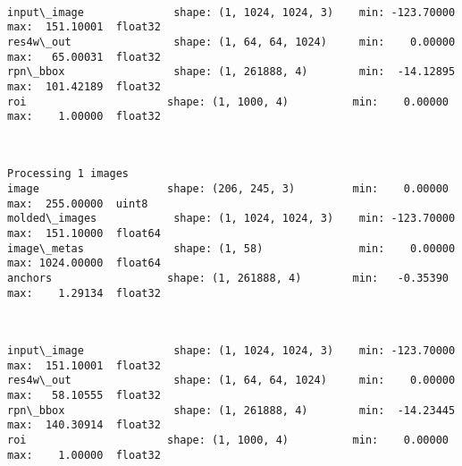 \documentclass[11pt]{article}
\begin{document}
    \begin{center}
    \end{center}
    { \hspace*{\fill} \\}
    
    \begin{Verbatim}[commandchars=\\\{\}]
input\_image              shape: (1, 1024, 1024, 3)    min: -123.70000  max:  151.10001  float32
res4w\_out                shape: (1, 64, 64, 1024)     min:    0.00000  max:   65.00031  float32
rpn\_bbox                 shape: (1, 261888, 4)        min:  -14.12895  max:  101.42189  float32
roi                      shape: (1, 1000, 4)          min:    0.00000  max:    1.00000  float32

    \end{Verbatim}

    \begin{center}
    \end{center}
    { \hspace*{\fill} \\}
    
    \begin{Verbatim}[commandchars=\\\{\}]
Processing 1 images
image                    shape: (206, 245, 3)         min:    0.00000  max:  255.00000  uint8
molded\_images            shape: (1, 1024, 1024, 3)    min: -123.70000  max:  151.10000  float64
image\_metas              shape: (1, 58)               min:    0.00000  max: 1024.00000  float64
anchors                  shape: (1, 261888, 4)        min:   -0.35390  max:    1.29134  float32

    \end{Verbatim}

    \begin{center}
    \end{center}
    { \hspace*{\fill} \\}
    
    \begin{Verbatim}[commandchars=\\\{\}]
input\_image              shape: (1, 1024, 1024, 3)    min: -123.70000  max:  151.10001  float32
res4w\_out                shape: (1, 64, 64, 1024)     min:    0.00000  max:   58.10555  float32
rpn\_bbox                 shape: (1, 261888, 4)        min:  -14.23445  max:  140.30914  float32
roi                      shape: (1, 1000, 4)          min:    0.00000  max:    1.00000  float32

    \end{Verbatim}
\end{document}
